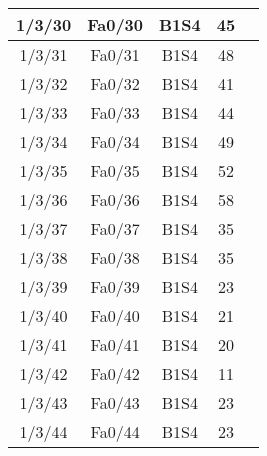 \begin{center}
\begin{longtable}{|c|c|c|c|c|}
	1/3/30 & Fa0/30 & B1S4 & 45 \\ \hline
	1/3/31 & Fa0/31 & B1S4 & 48 \\ \hline
	1/3/32 & Fa0/32 & B1S4 & 41 \\ \hline
	1/3/33 & Fa0/33 & B1S4 & 44 \\ \hline
	1/3/34 & Fa0/34 & B1S4 & 49 \\ \hline
	1/3/35 & Fa0/35 & B1S4 & 52 \\ \hline
	1/3/36 & Fa0/36 & B1S4 & 58 \\ \hline
	1/3/37 & Fa0/37 & B1S4 & 35 \\ \hline
	1/3/38 & Fa0/38 & B1S4 & 35 \\ \hline
	1/3/39 & Fa0/39 & B1S4 & 23 \\ \hline
	1/3/40 & Fa0/40 & B1S4 & 21 \\ \hline
	1/3/41 & Fa0/41 & B1S4 & 20 \\ \hline
	1/3/42 & Fa0/42 & B1S4 & 11 \\ \hline
	1/3/43 & Fa0/43 & B1S4 & 23 \\ \hline
	1/3/44 & Fa0/44 & B1S4 & 23 \\ \hline

    \end{longtable}
\end{center}

